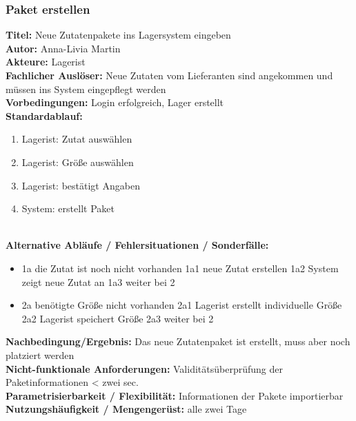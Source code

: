 \subsubsection{Paket erstellen}
\textbf{Titel:} Neue Zutatenpakete ins Lagersystem eingeben\\
\textbf{Autor:} Anna-Livia Martin\\
\textbf{Akteure:} Lagerist\\
\textbf{Fachlicher Auslöser:} Neue Zutaten vom Lieferanten sind angekommen und müssen ins System eingepflegt werden\\
\textbf{Vorbedingungen:} Login erfolgreich, Lager erstellt\\
\textbf{Standardablauf:}\\
\begin{enumerate}
    \item Lagerist: Zutat auswählen
    \item Lagerist: Größe auswählen
    \item Lagerist: bestätigt Angaben
    \item System: erstellt Paket
\end{enumerate}\\
\textbf{Alternative Abläufe / Fehlersituationen / Sonderfälle:}\\
\begin{itemize}
	\item 1a die Zutat ist noch nicht vorhanden
		\subitem 1a1 neue Zutat erstellen
		\subitem 1a2 System zeigt neue Zutat an
		\subitem 1a3 weiter bei 2
	\item 2a benötigte Größe nicht vorhanden
		\subitem 2a1 Lagerist erstellt individuelle Größe
		\subitem 2a2 Lagerist speichert Größe
		\subitem 2a3 weiter bei 2
\end{itemize}
\textbf{Nachbedingung/Ergebnis:} Das neue Zutatenpaket ist erstellt, muss aber noch platziert werden\\
\textbf{Nicht-funktionale Anforderungen:} Validitätsüberprüfung der Paketinformationen < zwei sec.\\
\textbf{Parametrisierbarkeit / Flexibilität:} Informationen der Pakete importierbar\\
\textbf{Nutzungshäufigkeit / Mengengerüst:} alle zwei Tage\\

